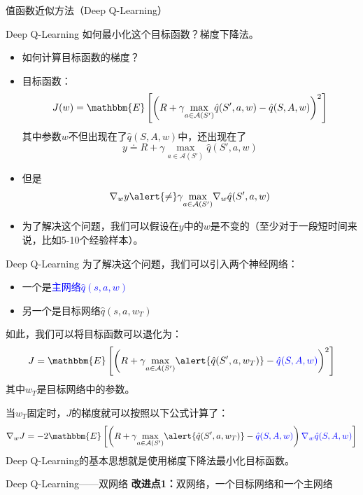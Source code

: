 \begin{section}{值函数近似方法\alert{（Deep Q-Learning）}}
\begin{frame}{Deep Q-Learning}
    如何最小化这个目标函数？梯度下降法。
    \begin{itemize}
        \item 如何计算目标函数的梯度？
        \item 目标函数：
        \[
            J(w)=\mathbbm{E}\left[\left(R+\gamma \underset{a\in \mathcal{A}(S')}{\max}\hat{q}(S',a,w)-\hat{q}(S,A,w)\right)^2\right]
        \]
        其中参数$w$不但出现在了$\hat{q}(S,A,w)$中，还出现在了
        \[
            y\doteq R+\gamma\underset{a\in \mathcal{A}(S')}{\max}\hat{q}(S',a,w)
        \]
        \item 但是
        \[
            \nabla_wy\alert{\neq} \gamma\underset{a\in \mathcal{A}(S')}{\max}\nabla_w\hat{q}(S',a,w)
        \]
        \item 为了解决这个问题，我们可以假设在$y$中的$w$是不变的（至少对于一段短时间来说，比如5-10个经验样本）。
    \end{itemize}
\end{frame}

\begin{frame}{Deep Q-Learning}
    为了解决这个问题，我们可以引入两个神经网络：
    \begin{itemize}
        \item 一个是\textcolor{blue}{主网络$\hat{q}(s,a,w)$}
        \item 另一个是\alert{目标网络$\hat{q}(s,a,w_T)$}
    \end{itemize}
    如此，我们可以将目标函数可以退化为：
    \[
        J=\mathbbm{E}\left[\left(R+\gamma \underset{a\in \mathcal{A}(S')}{\max}\alert{\hat{q}(S',a,w_T)}-\textcolor{blue}{\hat{q}(S,A,w)}\right)^2\right]
    \]
    其中$w_T$是目标网络中的参数。

    当$w_T$固定时，$J$的梯度就可以按照以下公式计算了：
    \[
        \nabla_wJ=-2\mathbbm{E}\left[\left(R+\gamma \underset{a\in \mathcal{A}(S')}{\max}\alert{\hat{q}(S',a,w_T)}-\textcolor{blue}{\hat{q}(S,A,w)}\right) \textcolor{blue}{\nabla_w\hat{q}(S,A,w)}\right]
    \]
    Deep Q-Learning的基本思想就是使用梯度下降法最小化目标函数。
\end{frame}

\begin{frame}{Deep Q-Learning——双网络}
    \textbf{改进点1：}\alert{双网络，一个目标网络和一个主网络}


\end{frame}
\end{section}
